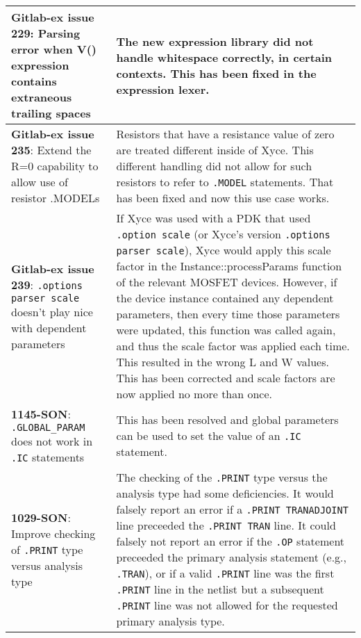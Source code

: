 {\begin{longtable}[h] {>{\raggedright\small}m{2in}|>{\raggedright\let\\\tabularnewline\small}m{3.5in}}
  \textbf{Gitlab-ex issue 229}: Parsing error when V() expression contains extraneous trailing spaces &
The new expression library did not handle whitespace correctly, in certain contexts.  
  This has been fixed in the expression lexer.
  \\ \hline

  \textbf{Gitlab-ex issue 235}: Extend the R=0 capability to allow use of resistor .MODELs & 
Resistors that have a resistance value of zero are treated different inside of Xyce.  
  This different handling did not allow for such resistors to refer to \texttt{.MODEL} statements.  
  That has been fixed and now this use case works.
  \\ \hline

  \textbf{Gitlab-ex issue 239}: \texttt{.options parser scale} doesn't play nice with dependent parameters & 
If Xyce was used with a PDK that used \texttt{.option scale} (or Xyce's version \texttt{.options parser scale}), Xyce would apply this scale factor in the Instance::processParams function of the relevant MOSFET devices.  However, if the device instance contained any dependent parameters, then every time those parameters were updated, this function was called again, and thus the scale factor was applied each time. This resulted in the wrong L and W values.  This has been corrected and scale factors are now applied no more than once.
  \\ \hline

  \textbf{1145-SON}: \texttt{.GLOBAL\_PARAM} does not work in \texttt{.IC} statements &  
      This has been resolved and global parameters can be used to set the 
      value of an \texttt{.IC} statement.\\ \hline

  \textbf{1029-SON}: Improve checking of \texttt{.PRINT} type versus analysis type &  
The checking of the \texttt{.PRINT} type versus the analysis type had some
deficiencies. It would falsely report an error if a \texttt{.PRINT TRANADJOINT} line
preceeded the \texttt{.PRINT TRAN} line.  It could falsely not report an error if
the \texttt{.OP} statement preceeded the primary analysis statement (e.g., 
\texttt{.TRAN}), or if a valid \texttt{.PRINT} line was the first \texttt{.PRINT}
line in the netlist but a subsequent \texttt{.PRINT} line was not allowed
for the requested primary analysis type. \\ \hline

\end{longtable}
}
